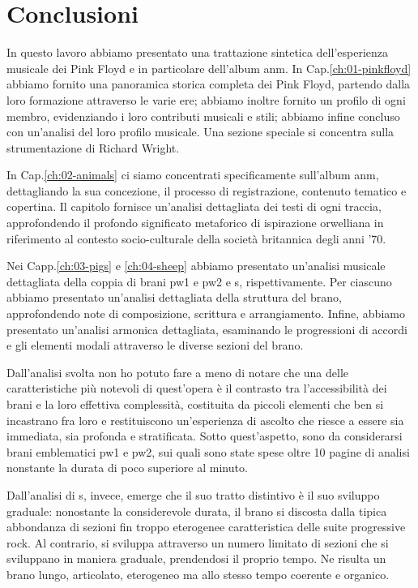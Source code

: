 \documentclass[class=book, crop=false, oneside, 12pt]{standalone}
\begin{document}
\chapter*{Conclusioni}

In questo lavoro abbiamo presentato una trattazione sintetica dell'esperienza musicale dei Pink Floyd e in particolare dell'album \acrlong{anm}. In Cap.\ref{ch:01-pinkfloyd} abbiamo fornito una panoramica storica completa dei Pink Floyd, partendo dalla loro formazione attraverso le varie ere; abbiamo inoltre fornito un profilo di ogni membro, evidenziando i loro contributi musicali e stili; abbiamo infine concluso con un'analisi del loro profilo musicale. Una sezione speciale si concentra sulla strumentazione di Richard Wright.

In Cap.\ref{ch:02-animals} ci siamo concentrati specificamente sull'album \acrshort{anm}, dettagliando la sua concezione, il processo di registrazione, contenuto tematico e copertina. Il capitolo fornisce un'analisi dettagliata dei testi di ogni traccia, approfondendo il profondo significato metaforico di ispirazione orwelliana in riferimento al contesto socio-culturale della società britannica degli anni '70.

Nei Capp.\ref{ch:03-pigs} e \ref{ch:04-sheep} abbiamo presentato un'analisi musicale dettagliata della coppia di brani \acrlong{pw1} e \acrlong{pw2} e \acrlong{s}, rispettivamente. Per ciascuno abbiamo presentato un'analisi dettagliata della struttura del brano, approfondendo note di composizione, scrittura e arrangiamento. Infine, abbiamo presentato un'analisi armonica dettagliata, esaminando le progressioni di accordi e gli elementi modali attraverso le diverse sezioni del brano.

Dall'analisi svolta non ho potuto fare a meno di notare che una delle caratteristiche più notevoli di quest'opera è il contrasto tra l'accessibilità dei brani e la loro effettiva complessità, costituita da piccoli elementi che ben si incastrano fra loro e restituiscono un'esperienza di ascolto che riesce a essere sia immediata, sia profonda e stratificata. Sotto quest'aspetto,  sono da considerarsi brani emblematici \acrshort{pw1} e \acrshort{pw2}, sui quali sono state spese oltre 10 pagine di analisi nonstante la durata di poco superiore al minuto.

Dall'analisi di \acrshort{s}, invece, emerge che il suo tratto distintivo è il suo sviluppo graduale: nonostante la considerevole durata, il brano si discosta dalla tipica abbondanza di sezioni fin troppo eterogenee caratteristica delle suite progressive rock. Al contrario, si sviluppa attraverso un numero limitato di sezioni che si sviluppano in maniera graduale, prendendosi il proprio tempo. Ne risulta un brano lungo, articolato, eterogeneo ma allo stesso tempo coerente e organico.
\end{document}
